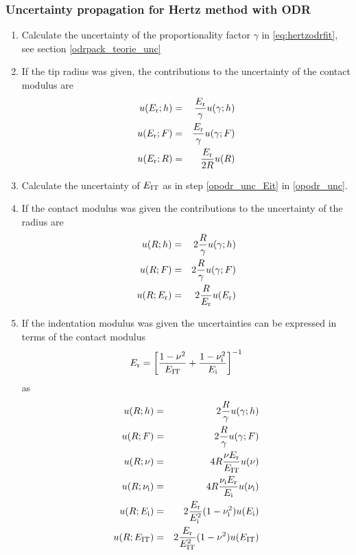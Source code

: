  
\subsubsection{Uncertainty propagation for Hertz method with ODR}\label{hertz_odr_unc}
\begin{enumerate}
 \item 
 Calculate the uncertainty of the proportionality factor $\gamma$ in \eqref{eq:hertzodrfit}, see section \ref{odrpack_teorie_unc}
  \item
If the tip radius was given, the contributions to the uncertainty of the contact modulus are
\begin{eqnarray*}
 u(E_\mathrm{r};h) &=&  \frac{E_\mathrm{r}}{\gamma} u(\gamma;h)  \\
 u(E_\mathrm{r};F) &=&  \frac{E_\mathrm{r}}{\gamma} u(\gamma;F)  \\ 
 u(E_\mathrm{r};R) &=&  \frac{E_\mathrm{r}}{2 R} u(R) 
 \end{eqnarray*}
 
\item Calculate the uncertainty of $E_\mathrm{IT}$ as in step \ref{opodr_unc_Eit} in \ref{opodr_unc}.

\item If the contact modulus was given the contributions to the uncertainty of the radius are
\begin{eqnarray*}
 u(R;h) &=&  2 \frac{R}{\gamma} u(\gamma;h) \\
 u(R;F) &=&  2 \frac{R}{\gamma} u(\gamma;F) \\ 
 u(R;E_\mathrm{r}) &=& 2\frac{R}{E_\mathrm{r}} u(E_\mathrm{r}) 
 \end{eqnarray*}
 
\item \label{hertz_odr_unc_Eit}
If the indentation modulus was given the uncertainties can be expressed in terms of the contact modulus
$$
E_\mathrm{r} = \left[ \frac{1-\nu^2}{E_\mathrm{IT}} + \frac{1-\nu_\mathrm{i}^2}{E_\mathrm{i}} \right]^{-1}
$$
as
\begin{eqnarray*}
 u(R;h) &=&  2 \frac{R}{\gamma} u(\gamma;h) \\
 u(R;F) &=&  2 \frac{R}{\gamma} u(\gamma;F) \\
 u(R;\nu) &=&  4 R \frac{ \nu E_\mathrm{r} }{E_\mathrm{IT}} u(\nu)\\
 u(R;\nu_\mathrm{i}) &=&  4  R \frac{ \nu_\mathrm{i} E_\mathrm{r} }{E_\mathrm{i}} u(\nu_\mathrm{i})\\
 u(R;E_\mathrm{i}) &=&  2 \frac{E_\mathrm{r}}{E_\mathrm{i}^2} (1-\nu_\mathrm{i}^2) u(E_\mathrm{i})\\
 u(R;E_\mathrm{IT}) &=& 2  \frac{E_\mathrm{r}}{ E_\mathrm{IT}^2} (1-\nu^2) u(E_\mathrm{IT})
\end{eqnarray*}
 \end{enumerate}
 
